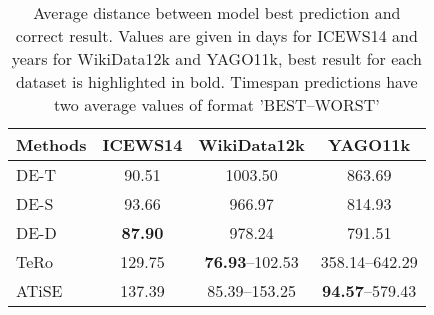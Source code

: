 \begin{table}[htb]
\centering
\begin{minipage}{\columnwidthcaption}
\centering
\caption{Average distance between model best prediction and correct result. Values are given in days for ICEWS14 and years for WikiData12k and YAGO11k, best result for each dataset is highlighted in bold. Timespan predictions have two average values of format '\textsc{BEST}–\textsc{WORST}'}
\vspace{-3mm}

\begin{tabular}{lccc}
\hline
Methods & ICEWS14 & WikiData12k & YAGO11k\\
\hline
DE-T & 90.51 & 1003.50 & 863.69\\
DE-S & 93.66 & 966.97 & 814.93\\
DE-D & \textbf{87.90} & 978.24 & 791.51\\
TeRo & 129.75 & \textbf{76.93}–102.53 & 358.14–642.29\\
ATiSE & 137.39 & 85.39–153.25 & \textbf{94.57}–579.43\\
\hline

\end{tabular}

\label{tab:temporal_precision_avg_diff}
\end{minipage}
\end{table}